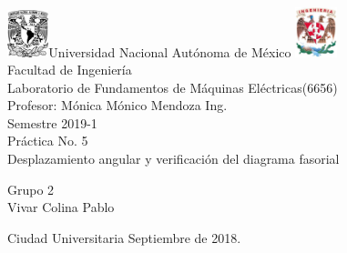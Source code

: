 

     \begin{center}
	\includegraphics[width=0.09\textwidth]{UNAM}\Large Universidad Nacional Autónoma de México
        	\includegraphics[width=0.09\textwidth]{FI}\\[2cm]
        \Large Facultad de Ingeniería\\[2cm]
         \Large Laboratorio de Fundamentos de Máquinas Eléctricas(6656)\\[2cm]
         \footnotesize Profesor: 
         Mónica Mónico Mendoza Ing.\\[2cm]
        \footnotesize Semestre 2019-1\\[2cm]
        
       

        \Large Práctica No. 5\\[2cm]
        
           

\Large Desplazamiento angular y verificación del diagrama fasorial
        
          \begin{flushright}
\footnotesize  Grupo 2\\[1cm]
\footnotesize Vivar Colina Pablo\\[0.5cm]
 \end{flushright}
          \begin{flushleft}
        \footnotesize Ciudad Universitaria Septiembre de 2018.\\
          \end{flushleft}
         
          
   \end{center}
